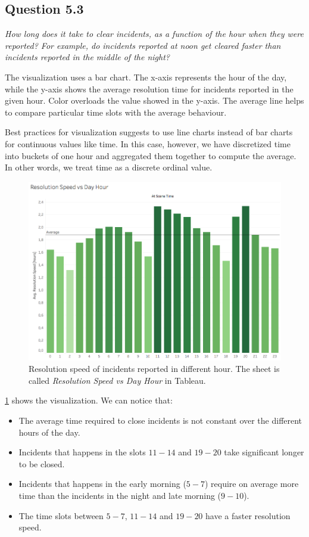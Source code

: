 \subsection*{Question 5.3}
\textit{How long does it take to clear incidents, as a function of the hour when they were reported? For example, do incidents reported at noon get cleared faster than incidents reported in the middle of the night?}

The visualization uses a bar chart.
The x-axis represents the hour of the day, while the y-axis shows the average resolution time for incidents reported in the given hour.
Color overloads the value showed in the y-axis.
The average line helps to compare particular time slots with the average behaviour.

Best practices for visualization suggests to use line charts instead of bar charts for continuous values like time.
In this case, however, we have discretized time into buckets of one hour and aggregated them together to compute the average.
In other words, we treat time as a discrete ordinal value.

\begin{figure}[h]
	\centering
	\includegraphics[width=0.9\columnwidth]{figures/5_3_resolution_speed_vs_hour}
	\caption{Resolution speed of incidents reported in different hour. The sheet is called \textit{Resolution Speed vs Day Hour} in Tableau.}
	\label{fig:5_3_resolution_speed_vs_hour}
\end{figure}

\cref{fig:5_3_resolution_speed_vs_hour} shows the visualization.
We can notice that:
\begin{itemize}
    \item The average time required to close incidents is not constant over the different hours of the day.
    \item Incidents that happens in the slots $11 - 14$ and $19 - 20$ take significant longer to be closed.
    \item Incidents that happens in the early morning ($5 - 7$) require on average more time than the incidents in the night and late morning ($9 - 10$).
    \item The time slots between $5 - 7$, $11 - 14$ and $19 - 20$ have a faster resolution speed.
\end{itemize}

